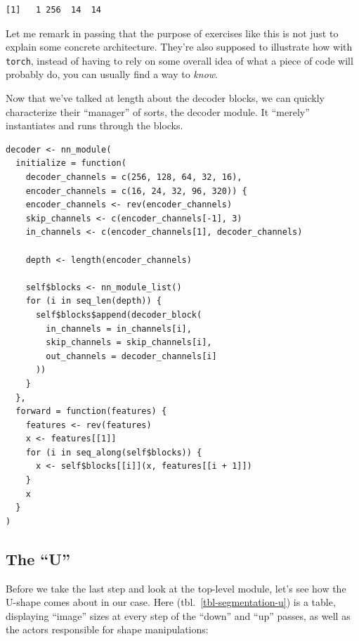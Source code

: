 \documentclass[
  letterpaper,
]{krantz}
\begin{document}
\begin{verbatim}
[1]   1 256  14  14
\end{verbatim}

Let me remark in passing that the purpose of exercises like this is not
just to explain some concrete architecture. They're also supposed to
illustrate how with \texttt{torch}, instead of having to rely on some
overall idea of what a piece of code will probably do, you can usually
find a way to \emph{know}.

Now that we've talked at length about the decoder blocks, we can quickly
characterize their ``manager'' of sorts, the decoder module. It
``merely'' instantiates and runs through the blocks.

\begin{verbatim}
decoder <- nn_module(
  initialize = function(
    decoder_channels = c(256, 128, 64, 32, 16),
    encoder_channels = c(16, 24, 32, 96, 320)) {
    encoder_channels <- rev(encoder_channels)
    skip_channels <- c(encoder_channels[-1], 3)
    in_channels <- c(encoder_channels[1], decoder_channels)

    depth <- length(encoder_channels)

    self$blocks <- nn_module_list()
    for (i in seq_len(depth)) {
      self$blocks$append(decoder_block(
        in_channels = in_channels[i],
        skip_channels = skip_channels[i],
        out_channels = decoder_channels[i]
      ))
    }
  },
  forward = function(features) {
    features <- rev(features)
    x <- features[[1]]
    for (i in seq_along(self$blocks)) {
      x <- self$blocks[[i]](x, features[[i + 1]])
    }
    x
  }
)
\end{verbatim}

\hypertarget{the-u}{%
\subsection{The ``U''}\label{the-u}}

Before we take the last step and look at the top-level module, let's see
how the U-shape comes about in our case. Here
(tbl.~\ref{tbl-segmentation-u}) is a table, displaying ``image'' sizes
at every step of the ``down'' and ``up'' passes, as well as the actors
responsible for shape manipulations:
\end{document}
